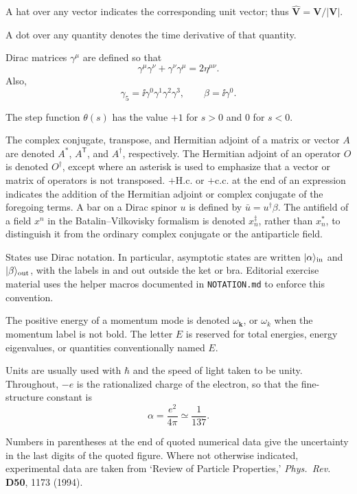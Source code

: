 A hat over any vector indicates the corresponding unit vector; thus
\(\widehat{\mathbf V}=\mathbf V/\lvert\mathbf V\rvert\).

A dot over any quantity denotes the time derivative of that quantity.

Dirac matrices \(\gamma^\mu\) are defined so that
\[
  \gamma^\mu\gamma^\nu+\gamma^\nu\gamma^\mu=2\eta^{\mu\nu}.
\]
Also,
\[
  \gamma_5=\ii\gamma^0\gamma^1\gamma^2\gamma^3,
  \qquad
  \beta=\ii\gamma^0.
\]

The step function \(\theta(s)\) has the value \(+1\) for \(s>0\) and \(0\) for
\(s<0\).

The complex conjugate, transpose, and Hermitian adjoint of a matrix or vector
\(A\) are denoted \(A^*\), \(A^{\mathsf T}\), and \(A^\dagger\), respectively.
The Hermitian adjoint of an operator \(O\) is denoted \(O^\dagger\), except
where an asterisk is used to emphasize that a vector or matrix of operators is
not transposed. \(+\mathrm{H.c.}\) or \(+\mathrm{c.c.}\) at the end of an
expression indicates the addition of the Hermitian adjoint or complex
conjugate of the foregoing terms. A bar on a Dirac spinor \(u\) is defined by
\(\bar u=u^\dagger\beta\). The antifield of a field \(x^n\) in the
Batalin--Vilkovisky formalism is denoted \(x_n^{\ddagger}\), rather than
\(x_n^*\), to distinguish it from the ordinary complex conjugate or the
antiparticle field.

States use Dirac notation. In particular, asymptotic states are written
\(\lvert \alpha\rangle_{\mathrm{in}}\) and \(\lvert \beta\rangle_{\mathrm{out}}\), with the
labels \(\mathrm{in}\) and \(\mathrm{out}\) outside the ket or bra. Editorial
exercise material uses the helper macros documented in \texttt{NOTATION.md}
to enforce this convention.

The positive energy of a momentum mode is denoted
\(\omega_{\mathbf k}\), or \(\omega_k\) when the momentum label is not
bold. The letter \(E\) is reserved for total energies, energy eigenvalues, or
quantities conventionally named \(E\).

Units are usually used with \(\hbar\) and the speed of light taken to be unity.
Throughout, \(-e\) is the rationalized charge of the electron, so that the
fine-structure constant is
\[
  \alpha=\frac{e^2}{4\pi}\simeq\frac{1}{137}.
\]

Numbers in parentheses at the end of quoted numerical data give the
uncertainty in the last digits of the quoted figure. Where not otherwise
indicated, experimental data are taken from `Review of Particle Properties,'
\emph{Phys.\ Rev.} \textbf{D50}, 1173 (1994).
